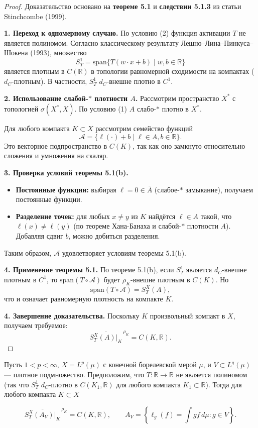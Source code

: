 \documentclass[../NDCNNAI_main.tex]{subfiles}
\begin{document}
\begin{proof}
Доказательство основано на \textbf{теореме 5.1} и \textbf{следствии 5.1.3} из статьи Stinchcombe (1999).

\textbf{1. Переход к одномерному случаю.} По условию (2) функция активации $T$ не является полиномом. Согласно классическому результату Лешно--Лина--Пинкуса--Шокена (1993), множество 
    \[
    S_T^1 = \mathrm{span}\{ T(w \cdot x + b) \mid w, b \in \mathbb{R} \}
    \]
    является плотным в $C(\mathbb{R})$ в топологии равномерной сходимости на компактах ($d_C$-плотным). В частности, $S_T^1$ $d_C$-внешне плотно в $C^1$.

\textbf{2. Использование слабой-$\ast$ плотности $A$.} 
    Рассмотрим пространство $X^*$ с топологией $\sigma(X^*, X)$. По условию (1) $A$ слабо-$\ast$ плотно в $X^*$. 
    
    Для любого компакта $K \subset X$ рассмотрим семейство функций 
    \[
    \mathcal{A} = \{ \ell(\cdot) + b \mid \ell \in A, b \in \mathbb{R} \}.
    \]
    Это векторное подпространство в $C(K)$, так как оно замкнуто относительно сложения и умножения на скаляр.

\textbf{3. Проверка условий теоремы 5.1(b).} 
    \begin{itemize}
        \item \textbf{Постоянные функции:} выбирая $\ell = 0 \in \overline{A}$ (слабое-$\ast$ замыкание), получаем постоянные функции.
        \item \textbf{Разделение точек:} для любых $x \neq y$ из $K$ найдётся $\ell \in A$ такой, что $\ell(x) \neq \ell(y)$ (по теореме Хана-Банаха и слабой-$\ast$ плотности $A$). Добавляя сдвиг $b$, можно добиться разделения.
    \end{itemize}
    Таким образом, $\mathcal{A}$ удовлетворяет условиям теоремы 5.1(b).

\textbf{4. Применение теоремы 5.1.} 
    По теореме 5.1(b), если $S_T^1$ является $d_C$-внешне плотным в $C^1$, то $\mathrm{span}(T \circ \mathcal{A})$ будет $\rho_K$-внешне плотным в $C(K)$. Но
    \[
    \mathrm{span}(T \circ \mathcal{A}) = S_T^X(A),
    \]
    что и означает равномерную плотность на компакте $K$.

\textbf{4. Завершение доказательства.} 
    Поскольку $K$ произвольный компакт в $X$, получаем требуемое:
    \[
    \overline{S_T^X(A) \big|_K}^{\,\rho_K} = C(K, \mathbb{R}).
    \]

\end{proof}

\begin{theorem}
\label{thm:functional-UAT-Lp}
Пусть \( 1 < p < \infty \), \( X = L^p(\mu) \) с конечной борелевской мерой \(\mu\), и \( V \subset L^q(\mu) \) --- плотное подмножество. Предположим, что \( T: \mathbb{R} \to \mathbb{R} \) не является полиномом (так что \( S_T^1 \) \( d_C \)-плотно в \( C(K_1, \mathbb{R}) \) для любого компакта \( K_1 \subset \mathbb{R} \)). Тогда для любого компакта \( K \subset X \)

\[
\overline{S_T^X(A_V)|_K}^{\,\rho_K} = C(K, \mathbb{R}), \qquad 
A_V = \left\{ \ell_g(f) = \int g f \, d\mu : g \in V \right\}.
\]
\end{theorem}
\end{document}
